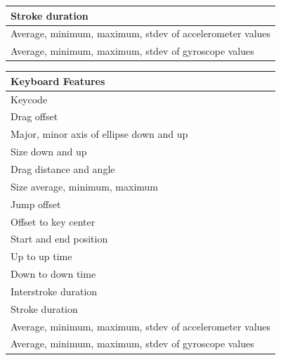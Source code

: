 \documentclass{llncs}
\begin{document}
\begin{table}
{\begin{tabularx}{\textwidth}{|X|}
  	Stroke duration~\cite{Frank13,buschek2015}                                                                              \\ \hline
  	Average, minimum, maximum, stdev of accelerometer values                                                                \\ \hline
  	Average, minimum, maximum, stdev of gyroscope values                                                                    \\ \hline
  \end{tabularx}
}
\end{table}


\begin{table}
\centering
{\scriptsize
\begin{tabularx}{\textwidth}{|X|}
	\hline
	\textbf{Keyboard Features}                               \\ \hline
	Keycode                                                  \\ \hline
	Drag offset                                              \\ \hline
	Major, minor axis of ellipse down and up                 \\ \hline
	Size down and up                                         \\ \hline
	Drag distance and angle~\cite{buschek2015}               \\ \hline
	Size average, minimum, maximum                           \\ \hline
	Jump offset~\cite{buschek2015}                           \\ \hline
	Offset to key center                                     \\ \hline
	Start and end position                                   \\ \hline
	Up to up time                                            \\ \hline
	Down to down time                                        \\ \hline
	Interstroke duration                                     \\ \hline
	Stroke duration                                          \\ \hline
	Average, minimum, maximum, stdev of accelerometer values \\ \hline
	Average, minimum, maximum, stdev of gyroscope values     \\ \hline
\end{tabularx}
}
\end{table}
\end{document}
